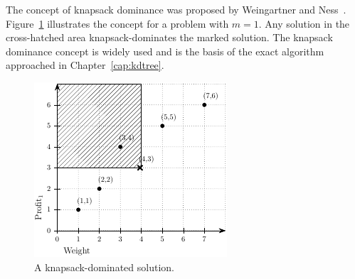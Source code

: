 The concept of knapsack dominance was proposed by Weingartner and Ness~\cite{weingartner1967methods}.
Figure~\ref{fig:kdom} illustrates the concept for a problem with $m = 1$.
Any solution in the cross-hatched area knapsack-dominates the marked solution.
The knapsack dominance concept is widely used
and is the basis of the exact algorithm
approached in Chapter~\ref{cap:kdtree}.

\begin{figure}
  \centering
  \includegraphics[scale=1.2]{img/kdt/dom}
  \caption{A knapsack-dominated solution.}
  \label{fig:kdom}
\end{figure}

